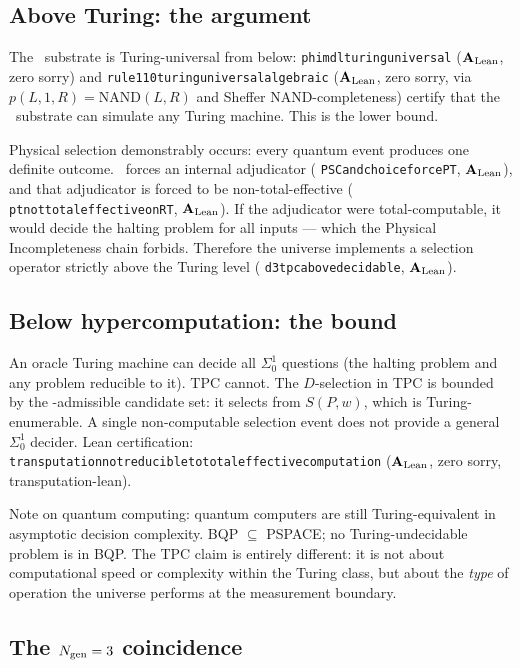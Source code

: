 \documentclass[11pt,openany]{book}
\theoremstyle{remark}
\newcommand{\GTE}{\text{GTE}}
\newcommand{\PSC}{\text{PSC}}
\newcommand{\lean}[1]{%
  \penalty-100
  \begingroup\def\_{\textunderscore\allowbreak}\texttt{#1}\endgroup}
\newcommand{\CatAL}{\ensuremath{\textbf{A}_{\rm Lean}}}
\begin{document}
\subsection*{Above Turing: the argument}

The \GTE\ substrate is Turing-universal from below:
\lean{phimdl\_turing\_universal} (\CatAL, zero sorry) and
\lean{rule110\_turing\_universal\_algebraic} (\CatAL, zero sorry, via
$p(L,1,R) = \mathrm{NAND}(L,R)$ and Sheffer NAND-completeness) certify that
the \GTE\ substrate can simulate any Turing machine. This is the lower bound.

Physical selection demonstrably occurs: every quantum event produces one definite
outcome. \PSC\ forces an internal adjudicator (\lean{PSC\_and\_choice\_force\_PT},
\CatAL), and that adjudicator is forced to be non-total-effective
(\lean{pt\_not\_total\_effective\_on\_RT}, \CatAL). If the adjudicator were
total-computable, it would decide the halting problem for all inputs --- which
the Physical Incompleteness chain forbids. Therefore the universe implements a
selection operator strictly above the Turing level
(\lean{d3\_tpc\_above\_decidable}, \CatAL).

\subsection*{Below hypercomputation: the bound}

An oracle Turing machine can decide all $\Sigma^1_0$ questions (the halting
problem and any problem reducible to it). TPC cannot. The $D$-selection in TPC
is bounded by the \PSC-admissible candidate set: it selects from $S(P,w)$, which
is Turing-enumerable. A single non-computable selection event does not provide
a general $\Sigma^1_0$ decider. Lean certification:
\lean{transputation\_not\_reducible\_to\_total\_effective\_computation}
(\CatAL, zero sorry, transputation-lean).

Note on quantum computing: quantum computers are still Turing-equivalent in
asymptotic decision complexity. BQP $\subseteq$ PSPACE; no Turing-undecidable
problem is in BQP. The TPC claim is entirely different: it is not about
computational speed or complexity within the Turing class, but about the
\emph{type} of operation the universe performs at the measurement boundary.

\subsection*{The $N_{\rm gen} = 3$ coincidence}
\end{document}
